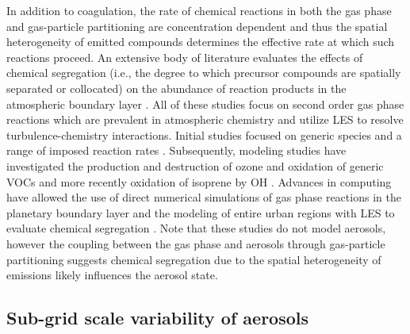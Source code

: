 In addition to coagulation, the rate of chemical reactions in both the gas phase and gas-particle partitioning are concentration dependent and thus the spatial heterogeneity of emitted compounds  determines the effective rate at which such reactions proceed. An extensive body of literature evaluates the effects of chemical segregation (i.e., the degree to which precursor compounds are spatially separated or collocated) on the abundance of reaction products in the atmospheric boundary layer \parencite{schumann_large-eddy_1989, sykes_turbulent_1994, molemaker_control_1998, krol_effects_2000, vinuesa_fluxes_2003, auger_chemical_2007, pugh_influence_2011, ouwersloot_segregation_2011, dlugi_balances_2014, kim_impact_2016, li_error_2021, wang_segregation_2022}. All of these studies focus on second order gas phase reactions which are prevalent in atmospheric chemistry and utilize LES to resolve turbulence-chemistry interactions. Initial studies focused on generic species and a range of imposed reaction rates \parencite{schumann_large-eddy_1989, sykes_turbulent_1994, molemaker_control_1998}. Subsequently, modeling studies have investigated the production and destruction of ozone and oxidation of generic VOCs \parencite{krol_effects_2000, auger_chemical_2007} and more recently oxidation of isoprene by OH \parencite{pugh_influence_2011, ouwersloot_segregation_2011, dlugi_balances_2014, kim_impact_2016}. Advances in computing have allowed the use of direct numerical simulations of gas phase reactions in the planetary boundary layer \parencite{li_error_2021} and the modeling of entire urban regions with LES to evaluate chemical segregation \parencite{wang_segregation_2022}. Note that these studies do not model aerosols, however the coupling between the gas phase and aerosols through gas-particle partitioning suggests chemical segregation due to the spatial heterogeneity of emissions likely influences the aerosol state. %

\subsection{Sub-grid scale variability of aerosols}

